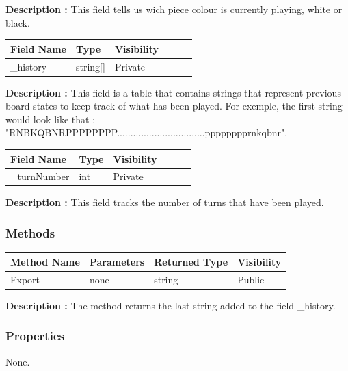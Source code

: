 \documentclass[12pt]{article}
\begin{document}
\textbf{Description :} This field tells us wich piece colour is
currently playing, white or black.

\begin{table}[H]
    \begin{tabular}{llllll}
    \hline
    \multicolumn{1}{|l|}{\cellcolor[HTML]{EFEFEF}\textbf{Field Name}} & \multicolumn{1}{l|}{\cellcolor[HTML]{EFEFEF}\textbf{Type}} & \multicolumn{1}{l|}{\cellcolor[HTML]{EFEFEF}\textbf{Visibility}} \\ \hline
    \multicolumn{1}{|l|}{\_history}                                     & \multicolumn{1}{l|}{string[]}                            & \multicolumn{1}{l|}{Private}                                     \\ \hline
    \end{tabular}
\end{table}

\textbf{Description :} This field is a table that contains strings that
represent previous board states to keep track of what has been played. For exemple,
the first string would look like that :
\\"RNBKQBNRPPPPPPPP.................................pppppppprnkqbnr". 

\begin{table}[H]
    \begin{tabular}{llllll}
    \hline
    \multicolumn{1}{|l|}{\cellcolor[HTML]{EFEFEF}\textbf{Field Name}} & \multicolumn{1}{l|}{\cellcolor[HTML]{EFEFEF}\textbf{Type}} & \multicolumn{1}{l|}{\cellcolor[HTML]{EFEFEF}\textbf{Visibility}} \\ \hline
    \multicolumn{1}{|l|}{\_turnNumber}                                & \multicolumn{1}{l|}{int}                                   & \multicolumn{1}{l|}{Private}                                     \\ \hline
    \end{tabular}
\end{table}

\textbf{Description :} This field tracks the number of turns that have been played.

\subsubsection{Methods}

\begin{table}[H]
    \begin{tabular}{|l|l|l|l|}
    \hline
    \rowcolor[HTML]{EFEFEF} 
    \cellcolor[HTML]{EFEFEF}\textbf{Method Name} & \textbf{Parameters}  & \textbf{Returned Type} & \textbf{Visibility} \\ \hline
    Export                                       & none                 & string                 & Public              \\ \hline
    \end{tabular}
\end{table}

\textbf{Description :} The method returns the last string added to the field \_history.

\subsubsection{Properties}

None.
\newpage
\end{document}
